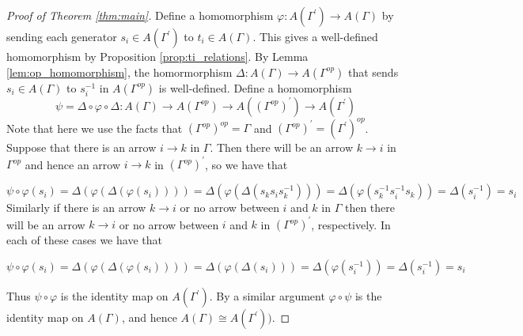 \documentclass[11pt]{amsart}
\theoremstyle{definition}
\begin{document}
\begin{proof}[Proof of Theorem \ref{thm:main}]
Define a homomorphism $\varphi\colon A(\Gamma^{\prime}) \rightarrow A(\Gamma)$ by sending each generator $s_i\in A(\Gamma^{\prime})$ to $t_i\in A(\Gamma)$.   This gives a well-defined homomorphism by Proposition \ref{prop:ti_relations}.  By Lemma \ref{lem:op_homomorphism}, the homormorphism $\Delta\colon A(\Gamma) \rightarrow A(\Gamma^{op})$ that sends $s_i\in A(\Gamma)$ to $s_i^{-1}$ in $A(\Gamma^{op})$ is well-defined.  Define a homomorphism 
$$\psi = \Delta\circ\varphi\circ\Delta\colon A(\Gamma)\rightarrow A(\Gamma^{op})\rightarrow A(\left(\Gamma^{op}\right)^{\prime}) \rightarrow A(\Gamma^{\prime})$$
Note that here we use the facts that $\left(\Gamma^{op}\right)^{op} = \Gamma$ and $\left(\Gamma^{op}\right)^{\prime} = \left(\Gamma^{\prime}\right)^{op}$.  Suppose that there is an arrow $i\rightarrow k$ in $\Gamma$.  Then there will be an arrow $k\rightarrow i$ in $\Gamma^{op}$ and hence an arrow $i\rightarrow k$ in $\left(\Gamma^{op}\right)^{\prime}$, so we have that

$$\psi\circ\varphi(s_i) = \Delta(\varphi(\Delta(\varphi(s_i)))) = \Delta(\varphi(\Delta(s_ks_is_k^{-1}))) = \Delta(\varphi(s_k^{-1}s_i^{-1}s_k)) = \Delta(s_i^{-1}) = s_i$$
Similarly if there is an arrow $k\rightarrow i$ or no arrow between $i$ and $k$ in $\Gamma$ then there will be an arrow $k\rightarrow i$ or no arrow between $i$ and $k$ in $\left(\Gamma^{op}\right)^{\prime}$, respectively.  In each of these cases we have that

$$\psi\circ\varphi(s_i) = \Delta(\varphi(\Delta(\varphi(s_i)))) = \Delta(\varphi(\Delta(s_i))) = \Delta(\varphi(s_i^{-1})) = \Delta(s_i^{-1}) = s_i$$

Thus $\psi\circ\varphi$ is the identity map on $A(\Gamma^{\prime})$.  By a similar argument $\varphi\circ\psi$ is the identity map on $A(\Gamma)$, and hence $A(\Gamma)\cong A(\Gamma^{\prime}))$.
\end{proof}
\end{document}
